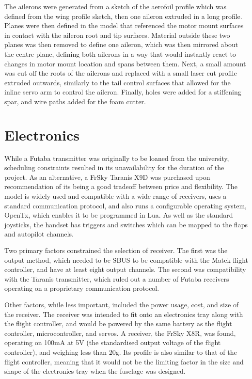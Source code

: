 \documentclass[../../main.tex]{subfiles}
\begin{document}
The ailerons were generated from a sketch of the aerofoil profile which was defined from the wing profile sketch, then one aileron extruded in a long profile.
Planes were then defined in the model that referenced the motor mount surfaces in contact with the aileron root and tip surfaces.
Material outside these two planes was then removed to define one aileron, which was then mirrored about the centre plane, defining both ailerons in a way that would instantly react to changes in motor mount location and spans between them.
Next, a small amount was cut off the roots of the ailerons and replaced with a small laser cut profile extruded outwards, similarly to the tail control surfaces that allowed for the inline servo arm to control the aileron.
Finally, holes were added for a stiffening spar, and wire paths added for the foam cutter. 


\section{Electronics} \label{sec:final-design-proposal:electronics}


While a Futaba transmitter was originally to be loaned from the university, scheduling constraints resulted in its unavailability for the duration of the project.
As an alternative, a FrSky Taranis X9D was purchased upon recommendation of its being a good tradeoff between price and flexibility.
The model is widely used and compatible with a wide range of receivers, uses a standard communication protocol, and also runs a configurable operating system, OpenTx, which enables it to be programmed in Lua.
As well as the standard joysticks, the handset has triggers and switches which can be mapped to the flaps and autopilot channels. 

Two primary factors constrained the selection of receiver.
The first was the output method, which needed to be SBUS to be compatible with the Matek flight controller, and have at least eight output channels.
The second was compatibility with the Taranis transmitter, which ruled out a number of Futaba receivers operating on a proprietary communication protocol. 

Other factors, while less important, included the power usage, cost, and size of the receiver.
The receiver was intended to fit onto an electronics tray along with the flight controller, and would be powered by the same battery as the flight controller, microcontroller, and servos.
A receiver, the FrSky X8R, was found, operating on 100mA at 5V (the standardised output voltage of the flight controller), and weighing less than 20g.
Its profile is also similar to that of the flight controller, meaning that it would not be the limiting factor in the size and shape of the electronics tray when the fuselage was designed. 
\end{document}
